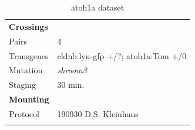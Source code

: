 \documentclass[11pt,singlespacinge,twoside]{reedthesis} %
\begin{document}
\begin{longtable}[]{@{}ll@{}}
\caption{\label{tab:atoset} atoh1a dataset}\tabularnewline
\toprule
\endhead
\begin{minipage}[t]{0.21\columnwidth}\raggedright
\textbf{Crossings}\strut
\end{minipage} & \begin{minipage}[t]{0.73\columnwidth}\raggedright
\strut
\end{minipage}\tabularnewline
\begin{minipage}[t]{0.21\columnwidth}\raggedright
Pairs\strut
\end{minipage} & \begin{minipage}[t]{0.73\columnwidth}\raggedright
4\strut
\end{minipage}\tabularnewline
\begin{minipage}[t]{0.21\columnwidth}\raggedright
Transgenes\strut
\end{minipage} & \begin{minipage}[t]{0.73\columnwidth}\raggedright
cldnb:lyn-gfp +/?; atoh1a:Tom +/0\strut
\end{minipage}\tabularnewline
\begin{minipage}[t]{0.21\columnwidth}\raggedright
Mutation\strut
\end{minipage} & \begin{minipage}[t]{0.73\columnwidth}\raggedright
\emph{shroom3}\strut
\end{minipage}\tabularnewline
\begin{minipage}[t]{0.21\columnwidth}\raggedright
Staging\strut
\end{minipage} & \begin{minipage}[t]{0.73\columnwidth}\raggedright
30 min.\strut
\end{minipage}\tabularnewline
\begin{minipage}[t]{0.21\columnwidth}\raggedright
\textbf{Mounting}\strut
\end{minipage} & \begin{minipage}[t]{0.73\columnwidth}\raggedright
\strut
\end{minipage}\tabularnewline
\begin{minipage}[t]{0.21\columnwidth}\raggedright
Protocol\strut
\end{minipage} & \begin{minipage}[t]{0.73\columnwidth}\raggedright
190930 D.S. Kleinhans\strut
\end{minipage}\tabularnewline
\begin{minipage}[t]{0.21\columnwidth}\raggedright

\end{minipage}
\end{longtable}
\end{document}
